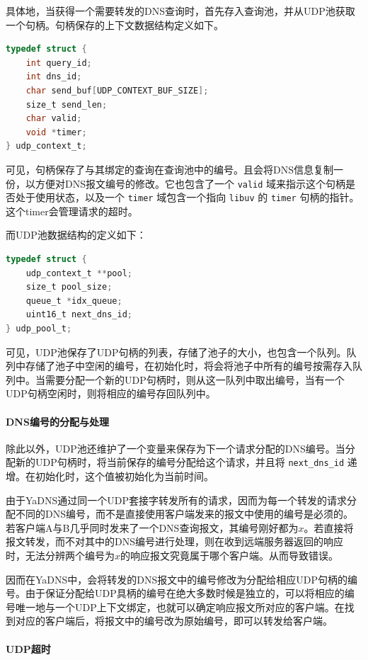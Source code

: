具体地，当获得一个需要转发的DNS查询时，首先存入查询池，并从UDP池获取一个句柄。句柄保存的上下文数据结构定义如下。

\begin{lstlisting}[language=C]
typedef struct {
    int query_id;
    int dns_id;
    char send_buf[UDP_CONTEXT_BUF_SIZE];
    size_t send_len;
    char valid;
    void *timer;
} udp_context_t;
\end{lstlisting}

可见，句柄保存了与其绑定的查询在查询池中的编号。且会将DNS信息复制一份，以方便对DNS报文编号的修改。它也包含了一个 \lstinline{valid} 域来指示这个句柄是否处于使用状态，以及一个 \lstinline{timer} 域包含一个指向 \lstinline{libuv} 的 \lstinline{timer} 句柄的指针。这个timer会管理请求的超时。

而UDP池数据结构的定义如下：

\begin{lstlisting}[language=C]
typedef struct {
    udp_context_t **pool;
    size_t pool_size;
    queue_t *idx_queue;
    uint16_t next_dns_id;
} udp_pool_t;
\end{lstlisting}

可见，UDP池保存了UDP句柄的列表，存储了池子的大小，也包含一个队列。队列中存储了池子中空闲的编号，在初始化时，将会将池子中所有的编号按需存入队列中。当需要分配一个新的UDP句柄时，则从这一队列中取出编号，当有一个UDP句柄空闲时，则将相应的编号存回队列中。

\paragraph{DNS编号的分配与处理} 除此以外，UDP池还维护了一个变量来保存为下一个请求分配的DNS编号。当分配新的UDP句柄时，将当前保存的编号分配给这个请求，并且将 \lstinline{next_dns_id} 递增。在初始化时，这个值被初始化为当前时间。

由于YaDNS通过同一个UDP套接字转发所有的请求，因而为每一个转发的请求分配不同的DNS编号，而不是直接使用客户端发来的报文中使用的编号是必须的。若客户端A与B几乎同时发来了一个DNS查询报文，其编号刚好都为$x$。若直接将报文转发，而不对其中的DNS编号进行处理，则在收到远端服务器返回的响应时，无法分辨两个编号为$x$的响应报文究竟属于哪个客户端。从而导致错误。

因而在YaDNS中，会将转发的DNS报文中的编号修改为分配给相应UDP句柄的编号。由于保证分配给UDP具柄的编号在绝大多数时候是独立的，可以将相应的编号唯一地与一个UDP上下文绑定，也就可以确定响应报文所对应的客户端。在找到对应的客户端后，将报文中的编号改为原始编号，即可以转发给客户端。

\paragraph{UDP超时}

